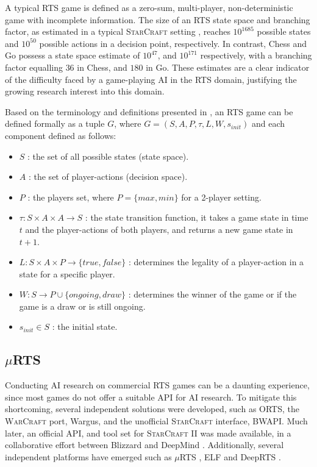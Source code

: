 \documentclass[conference]{IEEEtran}
\newcommand{\mRTS}{$\mu$RTS}
\begin{document}
A typical RTS game is defined as a zero-sum, multi-player, non-deterministic game with incomplete information. The size of an RTS state space and branching factor, as estimated in a typical \textsc{StarCraft} setting \cite{ontanon_survey_2013}, reaches $10^{1685}$ possible states and $10^{50}$ possible actions in a decision point, respectively. In contrast, Chess and Go possess a state space estimate of $10^{47}$, and $10^{171}$ respectively, with a branching factor equalling $36$ in Chess, and $180$ in Go. These estimates are a clear indicator of the difficulty faced by a game-playing AI in the RTS domain, justifying the growing research interest into this domain.

Based on the terminology and definitions presented in \cite{ontanon_combinatorial_2017}, an RTS game can be defined formally as a tuple $G$, where $G = (S, A, P, \tau, L, W, s_{init})$ and each component defined as follows:

\begin{itemize}
\item $S$ : the set of all possible states (state space).
\item $A$ : the set of player-actions (decision space).
\item $P$ : the players set, where $P=\{max,min\}$ for a 2-player setting.
\item $\tau : S \times A \times A \rightarrow S$ : the state transition function, it takes a game state in time $t$ and the player-actions of both players, and returns a new game state in $t+1$.
\item $L: S \times A \times P \rightarrow \{true,false\}$ : determines the legality of a player-action in a state for a specific player.
\item $W: S \rightarrow P \cup \{ongoing,draw\}$ : determines the winner of the game or if the game is a draw or is still ongoing.
\item $s_{init} \in S$ : the initial state.
\end{itemize}


\subsection{\mRTS{}}

Conducting AI research on commercial RTS games can be a daunting experience, since most games do not offer a suitable API for AI research. To mitigate this shortcoming, several independent solutions were developed, such as ORTS, the \textsc{WarCraft} port, Wargus, and the unofficial \textsc{StarCraft} interface, BWAPI. Much later, an official API, and tool set for \textsc{StarCraft II} was made available, in a collaborative effort between Blizzard and DeepMind \cite{vinyals_starcraft_2017-1}. Additionally, several independent platforms have emerged such as \mRTS{} \cite{ontanon_combinatorial_2013}, ELF \cite{tian_elf_2017} and DeepRTS \cite{andersen_deep_2018}.
\end{document}
